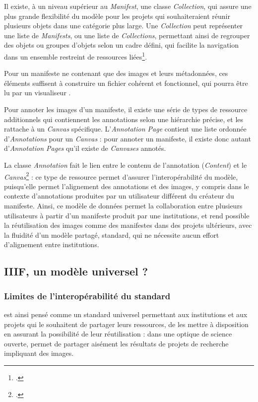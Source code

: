 Il existe, à un niveau supérieur au \textit{Manifest}, une classe \textit{Collection}, qui assure une plus grande flexibilité du modèle pour les projets qui souhaiteraient réunir plusieurs objets dans une catégorie plus large. Une \textit{Collection} peut représenter une liste de \textit{Manifests}, ou une liste de \textit{Collections}, permettant ainsi de regrouper des objets ou groupes d'objets selon un cadre défini, qui facilite la navigation dans un ensemble restreint de ressources liées\footcite{PresentationAPI}.

Pour un manifeste ne contenant que des images et leurs métadonnées, ces éléments suffisent à construire un fichier cohérent et fonctionnel, qui pourra être lu par un visualiseur \iiif.

Pour annoter les images d'un manifeste, il existe une série de types de ressource additionnels qui contiennent les annotations selon une hiérarchie précise, et les rattache à un \textit{Canvas} spécifique. L'\textit{Annotation Page} contient une liste ordonnée d'\textit{Annotations} pour un \textit{Canvas} : pour annoter un manifeste, il existe donc autant d'\textit{Annotation Pages} qu'il existe de \textit{Canvases} annotés.

La classe \textit{Annotation} fait le lien entre le contenu de l'annotation (\textit{Content}) et le \textit{Canvas}\footcite{PresentationAPI} : ce type de ressource permet d'assurer l'interopérabilité du modèle, puisqu'elle permet l'alignement des annotations et des images, y compris dans le contexte d'annotations produites par un utilisateur différent du créateur du manifeste. Ainsi, ce modèle de données permet la collaboration entre plusieurs utilisateurs à partir d'un manifeste produit par une institutions, et rend possible la réutilisation des images comme des manifestes dans des projets ultérieurs, avec la fluidité d'un modèle partagé, standard, qui ne nécessite aucun effort d'alignement entre institutions.
    
    \subsection{IIIF, un modèle universel ?}
        \subsubsection{Limites de l'interopérabilité du standard}
\iiif est ainsi pensé comme un standard universel permettant aux institutions et aux projets qui le souhaitent de partager leurs ressources, de les mettre à disposition en assurant la possibilité de leur réutilisation : dans une optique de science ouverte, \iiif permet de partager aisément les résultats de projets de recherche impliquant des images.

